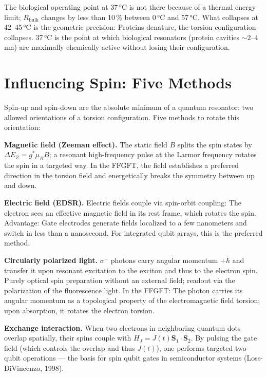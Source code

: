 The biological operating point at 37\,°C is not there because of a
thermal energy limit; $R_{\mathrm{bulk}}$ changes by less than 10\,\% between
0\,°C and 57\,°C. What collapses at 42--45\,°C
is the geometric precision: Proteins denature, the
torsion configuration collapses. 37\,°C is the point at which
biological resonators (protein cavities $\sim2$--4\,nm) are maximally chemically
active without losing their configuration.

\section{Influencing Spin: Five Methods}

Spin-up and spin-down are the absolute minimum of a quantum resonator:
two allowed orientations of a torsion configuration. Five
methods to rotate this orientation:

\textbf{Magnetic field (Zeeman effect).} The static field $B$ splits the
spin states by $\Delta E_Z = g^*\mu_BB$; a resonant
high-frequency pulse at the Larmor frequency rotates the spin in a targeted way. In the
FFGFT, the field establishes a preferred direction in the torsion field and
energetically breaks the symmetry between up and down.

\textbf{Electric field (EDSR).} Electric fields couple via
spin-orbit coupling: The electron sees an
effective magnetic field in its rest frame, which rotates the spin. Advantage: Gate electrodes
generate fields localized to a few nanometers and switch in less than a
nanosecond. For integrated qubit arrays, this is the preferred
method.

\textbf{Circularly polarized light.} $\sigma^+$ photons carry
angular momentum $+\hbar$ and transfer it upon resonant excitation to the
exciton and thus to the electron spin. Purely optical spin preparation
without an external field; readout via the polarization of the fluorescence light.
In the FFGFT: The photon carries its angular momentum as a topological
property of the electromagnetic field torsion; upon absorption,
it rotates the electron torsion.

\textbf{Exchange interaction.} When two electrons in neighboring
quantum dots overlap spatially, their spins couple with $H_J =
J(t)\mathbf{S}_1\cdot\mathbf{S}_2$. By pulsing the gate field
(which controls the overlap and thus $J(t)$), one performs targeted
two-qubit operations --- the basis for spin qubit gates in
semiconductor systems (Loss-DiVincenzo, 1998).

